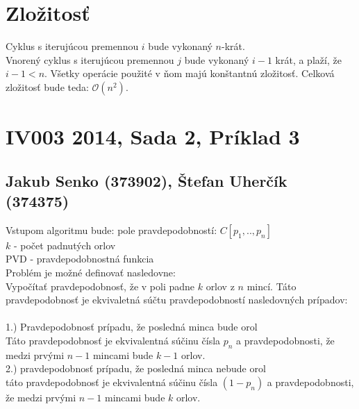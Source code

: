\documentclass[paper=a4, fontsize=11pt]{scrartcl} %
\numberwithin{equation}{section} %
\numberwithin{figure}{section} %
\numberwithin{table}{section} %
\begin{document}
	
	



 
\section*{Zložitosť}
Cyklus s iterujúcou premennou $i$ bude vykonaný $n$-krát. \ \\

Vnorený cyklus s iterujúcou premennou $j$ bude vykonaný $i-1$ krát, a plaží, že $i-1 < n$. Všetky operácie použité v ňom majú konštantnú zložitosť.
Celková zložitosť bude teda: $\mathcal{O}(n^2)$.

\pagebreak


\section*{IV003 2014, Sada 2, Príklad 3}
\subsection*{Jakub Senko (373902), Štefan Uherčík (374375)}

Vstupom algoritmu bude:
pole pravdepodobností: $C[{p}_1,..,{p}_n]$\\
$k$ - počet padnutých orlov\\
PVD - pravdepodobnostná funkcia\ \\

Problém je možné definovať nasledovne: \\
Vypočítať pravdepodobnosť, že v poli padne $k$ orlov z $n$ mincí.
Táto pravdepodobnosť je ekvivaletná súčtu pravdepodobností nasledovných prípadov: \ \\

1.) Pravdepodobnosť prípadu, že posledná minca bude orol \ \\
Táto pravdepodobnosť je ekvivalentná súčinu čísla ${p}_n$ a pravdepodobnosti, že medzi prvými $n-1$ mincami bude $k-1$ orlov. \ \\

2.) pravdepodobnosť prípadu, že posledná minca nebude orol \ \\
táto pravdepodobnosť je ekvivalentná súčinu čísla $(1-{p}_n)$ a pravdepodobnosti, že medzi prvými $n-1$ mincami bude $k$ orlov. \ \\
\end{document}
